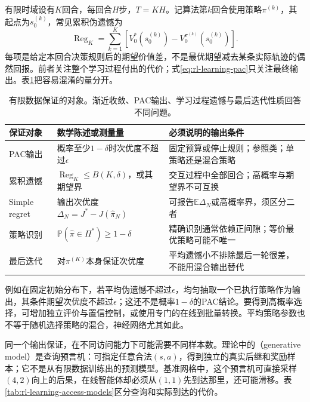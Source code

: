 有限时域设有$K$回合，每回合$H$步，$T=KH$。记算法第$k$回合使用策略$\pi^{(k)}$，其起点为$s_0^{(k)}$，常见累积伪遗憾为
\begin{equation}
 \operatorname{Reg}_K
   =\sum_{k=1}^{K}\left[
       V_0^*(s_0^{(k)})-V_0^{\pi^{(k)}}(s_0^{(k)})\right].
 \label{eq:rl-learning-episodic-regret}
\end{equation}
每项是给定本回合决策规则后的期望价值差，不是最优期望减去某条实际轨迹的偶然回报。前者关注整个学习过程付出的代价；式\eqref{eq:rl-learning-pac}只关注最终输出。表\ref{tab:rl-learning-guarantee-objects}把容易混淆的量分开。

\begin{table}[t]
  \centering
  \small
  \begin{tabularx}{\linewidth}{>{\raggedright\arraybackslash}p{24mm} >{\raggedright\arraybackslash}X >{\raggedright\arraybackslash}X}
    \toprule
    保证对象 & 数学陈述或测量量 & 必须说明的输出条件 \\
    \midrule
    PAC输出 & 概率至少$1-\delta$时次优度不超过$\epsilon$ & 固定预算或停止规则；参照类；单策略还是混合策略 \\
    累积遗憾 & $\operatorname{Reg}_K\leq B(K,\delta)$，或其期望界 & 交互过程中全部回合；高概率与期望界不可互换 \\
    Simple regret & 输出次优度$\Delta_N=J^*-J(\widehat\pi_N)$ & 可报告$\mathbb E\Delta_N$或高概率界，须区分二者 \\
    策略识别 & $\mathbb P(\widehat\pi\in\Pi^*)\geq1-\delta$ & 精确识别通常依赖正间隙；等价最优策略可能不唯一 \\
    最后迭代 & 对$\pi^{(K)}$本身保证次优度 & 平均遗憾小不排除最后一轮很差，不能用混合输出替代 \\
    \bottomrule
  \end{tabularx}
  \caption{有限数据保证的对象。渐近收敛、PAC输出、学习过程遗憾与最后迭代性质回答不同问题。}
  \label{tab:rl-learning-guarantee-objects}
\end{table}

例如在固定初始分布下，若平均伪遗憾不超过$\epsilon$，均匀抽取一个已执行策略作为输出，其条件期望次优度不超过$\epsilon$；这还不是概率$1-\delta$的PAC结论。要得到高概率选择，可增加独立评价与置信控制，或使用专门的在线到批量转换。平均策略参数也不等于随机选择策略的混合，神经网络尤其如此。

同一个输出保证，在不同访问能力下可能需要不同样本数。理论中的（generative model）是查询预言机：可指定任意合法$(s,a)$，得到独立的真实后继和奖励样本；它不是从有限数据训练出的预测模型。基准网格中，这个预言机可直接采样$(4,2)$向上的后果，在线智能体却必须从$(1,1)$先到达那里，还可能滑移。表\ref{tab:rl-learning-access-models}区分查询和实际到达的代价。

